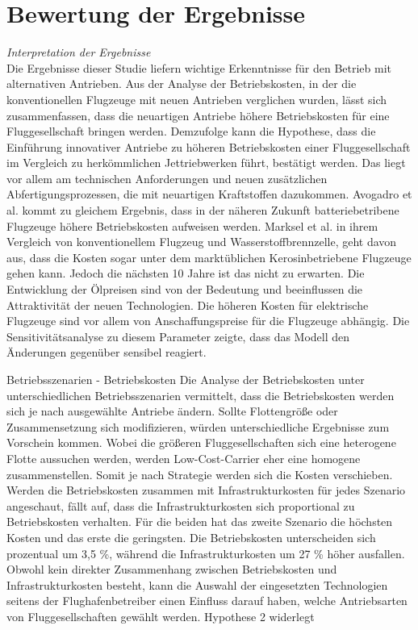 
\section{Bewertung der Ergebnisse}
\label{s:Bewertung der Ergebnisse}

\textit{Interpretation der Ergebnisse}\\
Die Ergebnisse dieser Studie liefern wichtige Erkenntnisse für den Betrieb mit alternativen Antrieben.
Aus der Analyse der Betriebskosten, in der die konventionellen Flugzeuge mit neuen Antrieben verglichen wurden, 
lässt sich zusammenfassen, dass die neuartigen Antriebe höhere Betriebskosten für eine Fluggesellschaft bringen werden.
Demzufolge kann die Hypothese, dass die Einführung innovativer Antriebe zu höheren Betriebskosten einer Fluggesellschaft im Vergleich zu herkömmlichen
Jettriebwerken führt, bestätigt werden. Das liegt vor allem am technischen Anforderungen und neuen zusätzlichen Abfertigungsprozessen, die mit neuartigen
Kraftstoffen dazukommen. Avogadro et al.\cite{avogadro2024demystifying} kommt zu gleichem Ergebnis, 
dass in der näheren Zukunft batteriebetribene Flugzeuge höhere Betriebskosten aufweisen werden. Marksel et al. \cite{marksel2023comparative} in ihrem
Vergleich von konventionellem Flugzeug und Wasserstoffbrennzelle, geht davon aus, dass die Kosten sogar unter dem marktüblichen Kerosinbetriebene
Flugzeuge gehen kann. Jedoch die nächsten 10 Jahre ist das nicht zu erwarten. Die Entwicklung der Ölpreisen sind von der Bedeutung und beeinflussen
die Attraktivität der neuen Technologien.
Die höheren Kosten für elektrische Flugzeuge sind vor allem von Anschaffungspreise für
die Flugzeuge abhängig. Die Sensitivitätsanalyse zu diesem Parameter zeigte, dass das Modell den Änderungen gegenüber sensibel reagiert.



Betriebsszenarien - Betriebskosten
Die Analyse der Betriebskosten unter unterschiedlichen Betriebsszenarien vermittelt, dass die Betriebskosten werden sich je nach
ausgewählte Antriebe ändern. Sollte Flottengröße oder Zusammensetzung sich modifizieren, würden unterschiedliche Ergebnisse zum Vorschein kommen.
Wobei die größeren Fluggesellschaften sich eine heterogene Flotte aussuchen werden, werden Low-Cost-Carrier eher eine homogene zusammenstellen.
Somit je nach Strategie werden sich die Kosten verschieben.
Werden die Betriebskosten zusammen mit Infrastrukturkosten für jedes Szenario angeschaut, fällt auf, dass die Infrastrukturkosten sich proportional 
zu Betriebskosten verhalten. Für die beiden hat das zweite Szenario die höchsten Kosten und das erste die geringsten. 
Die Betriebskosten unterscheiden sich prozentual um 3,5 \%, während die Infrastrukturkosten um 27 \% höher ausfallen.
Obwohl kein direkter Zusammenhang zwischen Betriebskosten und Infrastrukturkosten besteht, 
kann die Auswahl der eingesetzten Technologien seitens der Flughafenbetreiber einen Einfluss darauf haben, 
welche Antriebsarten von Fluggesellschaften gewählt werden.
Hypothese 2 widerlegt

